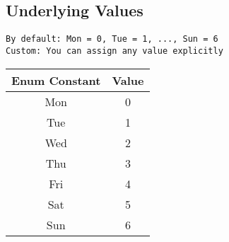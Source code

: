 \subsection*{Underlying Values}
\begin{verbatim}
By default: Mon = 0, Tue = 1, ..., Sun = 6
Custom: You can assign any value explicitly
\end{verbatim}

\begin{center}
\begin{tabular}{|c|c|}
\hline
Enum Constant & Value \\
\hline
Mon & 0 \\
Tue & 1 \\
Wed & 2 \\
Thu & 3 \\
Fri & 4 \\
Sat & 5 \\
Sun & 6 \\
\hline
\end{tabular}
\end{center}
